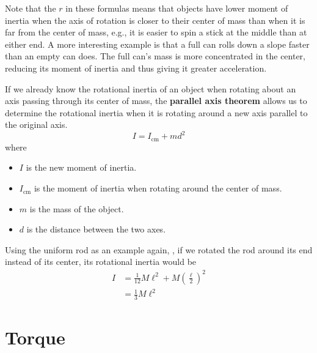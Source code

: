 \documentclass[a4paper, titlepage]{book}
\begin{document}

Note that the \(r\) in these formulas
means that objects have lower moment of inertia
when the axis of rotation is closer to their center of mass
than when it is far from the center of mass,
e.g., it is easier to spin a stick at the middle than at either end.
A more interesting example is that a full can rolls down a slope faster than an empty can does.
The full can's mass is more concentrated in the center,
reducing its moment of inertia and thus giving it greater acceleration.

If we already know the rotational inertia of an object
when rotating about an axis passing through its center of mass,
the \textbf{parallel axis theorem} allows us to determine the rotational inertia
when it is rotating around a new axis parallel to the original axis.
\begin{equation}
    I = I_\mathrm{cm} + m d^2
\end{equation}
where
\begin{itemize}
    \item \(I\) is the new moment of inertia.
    \item 
        \(I_\mathrm{cm}\) is the moment of inertia
        when rotating around the center of mass.
    \item \(m\) is the mass of the object.
    \item \(d\) is the distance between the two axes.
\end{itemize}


Using the uniform rod as an example again,
,
if we rotated the rod around its end instead of its center,
its rotational inertia would be
\begin{equation}
    \begin{aligned}
        I &= \frac{1}{12} M \ell^2
             + M \left( \frac{\ell}{2} \right)^2 \\
        &= \frac{1}{3} M \ell^2
    \end{aligned}
\end{equation}

\section{Torque}
\end{document}
